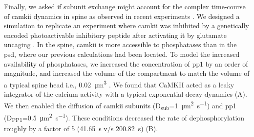 \documentclass[9pt,lineno,doublespacing]{elife}
\newcommand\SUB[2]{#1\textsubscript{#2}}
\begin{document}
Finally, we asked if subunit exchange might account for the complex time-course
of \gls{camkii} dynamics in spine as observed in recent experiments
\citep{chang_camkii_2017}. We designed a simulation to replicate an experiment
where \gls{camkii} was inhibited by a genetically encoded photoactivable
inhibitory peptide after activating it by glutamate uncaging
\citep{murakoshi_kinetics_2017}. In the spine, \gls{camkii} is more accessible
to phosphatases than in the \gls{psd}, where our previous calculations had been
located. To model the increased availability of phosphatases, we increased the
concentration of \gls{pp1} by an order of magnitude, and increased the volume of
the compartment to match the volume of a typical spine head i.e.,
\SI{0.02}{\cubic\micro\meter} \citep{bartol_nanoconnectomic_2015}. We found that
CaMKII acted as a leaky integrator of the calcium activity with a typical
exponential decay dynamics (A). We then enabled the
diffusion of \gls{camkii} subunits
(\SUB{D}{sub}=\SI{1}{\micro\meter\squared\per\second}) and \gls{pp1}
(\SUB{D}{PP1}=\SI{0.5}{\micro\meter\squared\per\second}). These conditions
decreased the rate of dephosphorylation roughly by a factor of 5
(\SI{41.65}{\second} v/s \SI{200.82}{\second}) (B). 
\end{document}

